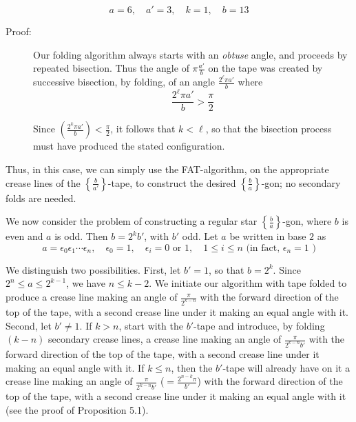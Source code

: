     \begin{equation*}
    a=6, \quad a'=3, \quad k=1, \quad b=13
    \end{equation*}
\begin{description}
  \item[Proof:] Our folding algorithm always starts with an \emph{obtuse} angle, and proceeds by repeated bisection. Thus the angle of $\pi \frac{a'}{b}$ on the tape was created by successive bisection, by folding, of an angle $\frac{2^{\ell} \pi a'}{b}$ where
    \begin{equation*}
    \frac{2^{\ell} \pi a'}{b} > \frac{\pi}{2}
    \end{equation*}

Since $\left( \frac{2^{k} \pi a'}{b} \right) < \frac{\pi}{2}$, it follows that $k < \ell$, so that the bisection process must have produced the stated configuration.

\end{description}

Thus, in this case, we can simply use the FAT-algorithm, on the appropriate crease lines of the $\left\{ \frac{b}{a'} \right\}$-tape, to construct the desired $\left\{ \frac{b}{a} \right\}$-gon; no secondary folds are needed.

We now consider the problem of constructing a regular star $\left\{ \frac{b}{a} \right\}$-gon, where $b$ is even and $a$ is odd. Then $b = 2^{k} b'$, with $b'$ odd. Let $a$ be written in base $2$ as
\begin{equation}
a = \epsilon_{0} \epsilon_{1} \cdots \epsilon_{n},  \quad  \epsilon_{0} = 1,  \quad  \epsilon_{i} = 0 \text{ or } 1,  \quad  1 \leq i \leq n \text{ (in fact, $\epsilon_{n} = 1$ )}  \tag{5.1}
\end{equation}

We distinguish two possibilities. First, let $b' = 1$, so that $b = 2^{k}$. Since $2^{n} \leq a \leq 2^{k-1}$, we have $n \leq k-2$. We initiate our algorithm with tape folded to produce a crease line making an angle of $\frac{\pi}{2^{k-n}}$ with the forward direction of the top of the tape, with a second crease line under it making an equal angle with it. Second, let $b' \neq 1$. If $k > n$, start with the $b'$-tape and introduce, by folding $(k-n)$ secondary crease lines, a crease line making an angle of $\frac{\pi}{2^{k-n} b'}$ with the forward direction of the top of the tape, with a second crease line under it making an equal angle with it. If $k \leq n$, then the $b'$-tape will already have on it a crease line making an angle of $\frac{\pi}{2^{k-n} b'}$ ($= \frac{2^{n-k} \pi}{b'}$) with the forward direction of the top of the tape, with a second crease line under it making an equal angle with it (see the proof of Proposition 5.1).

